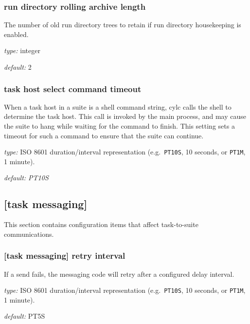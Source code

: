 \subsubsection{run directory rolling archive length}

The number of old run directory trees to retain if run directory
housekeeping is enabled.
\begin{myitemize}
\item {\em type:} integer
\item {\em default:} 2
\end{myitemize}

\subsubsection{task host select command timeout}

When a task host in a suite is a shell command string, cylc calls the shell to
determine the task host. This call is invoked by the main process, and may
cause the suite to hang while waiting for the command to finish. This setting
sets a timeout for such a command to ensure that the suite can continue.

\begin{myitemize}
\item {\em type:} ISO 8601 duration/interval representation (e.g.\ 
\lstinline=PT10S=, 10 seconds, or \lstinline=PT1M=, 1 minute).
\item {\em default: PT10S}
\end{myitemize}

\subsection{[task messaging]}

This section contains configuration items that affect task-to-suite
communications.

\subsubsection[retry interval]{[task messaging] \textrightarrow retry interval}

If a send fails, the messaging code will retry after a configured
delay interval.

\begin{myitemize}
\item {\em type:} ISO 8601 duration/interval representation (e.g.\ 
\lstinline=PT10S=, 10 seconds, or \lstinline=PT1M=, 1 minute).
\item {\em default:} PT5S
\end{myitemize}


